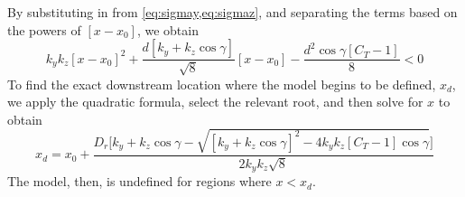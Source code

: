 \documentclass[conf]{new-aiaa}
\begin{document}
%
By substituting in from \cref{eq:sigmay,eq:sigmaz}, and separating the terms based on the powers of $[x-x_0]$, we obtain
%
\begin{equation}
	k_y k_z [x-x_0]^2 + \frac{d[k_y+k_z \cos{\gamma}]}{\sqrt{8}}[x-x_0] - \frac{d^2 \cos{\gamma}[C_T -1]}{8} < 0
\end{equation}
%
To find the exact downstream location where the model begins to be defined, $x_d$, we apply the quadratic formula, select the relevant root, and then solve for $x$ to obtain
%
\begin{equation}\label{eq:xd}
	x_d = x_0 + \frac{D_r\Big[k_y+k_z\cos{\gamma} - \sqrt{[k_y+k_z\cos{\gamma}]^2-4k_y k_z[C_T-1]\cos{\gamma}}\Big]}{2k_y k_z\sqrt{8}}
\end{equation}
%
The model, then, is undefined for regions where $x<x_d$. 

\vspace{5mm}
\end{document}
